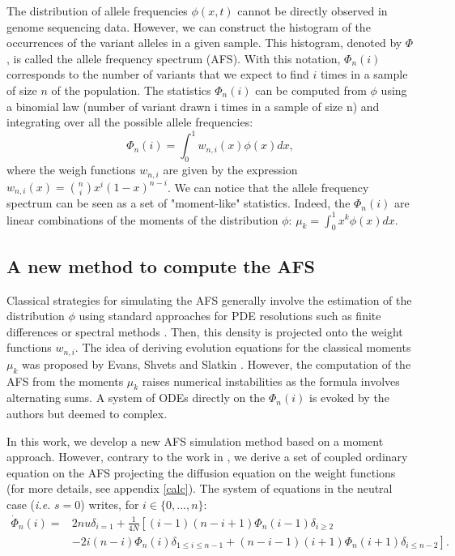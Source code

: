 The distribution of allele frequencies $\phi(x,t)$ cannot be directly observed in genome sequencing data. However, we can construct the histogram of the occurrences of the variant alleles in a given sample. This histogram, denoted by $\Phi$, is called the allele frequency spectrum (AFS). With this notation, $\Phi_n(i)$ corresponds to the number of variants that we expect to find $i$ times in a sample of size $n$ of the population. The statistics $\Phi_n(i)$ can be computed from $\phi$ using a binomial law (number of variant drawn i times in a sample of size n) and integrating over all the possible allele frequencies: 
$$
	 \Phi_n(i) = \int_0^1 w_{n,i}(x) \phi(x) dx,
$$
where the weigh functions $w_{n,i}$ are given by the expression $w_{n,i}(x) = {n\choose i}  x^i (1-x)^{n-i}$.
We can notice that the allele frequency spectrum can be seen as a set of "moment-like" statistics. Indeed, the $\Phi_n(i)$ are linear combinations of the moments of the distribution $\phi$: $\mu_k = \int_0^1 x^k \phi(x)dx$.

\subsection{A new method to compute the AFS}
Classical strategies for simulating the AFS generally involve the estimation of the distribution $\phi$ using standard approaches for PDE resolutions such as finite differences \cite{gutenkunst2009} or spectral methods \cite{lukic2011}. Then, this density is projected onto the weight functions $w_{n,i}$.
The idea of deriving evolution equations for the classical moments $\mu_k$ was proposed by Evans, Shvets and Slatkin \cite{evans2007}. However, the computation of the AFS from the moments $\mu_k$ raises numerical instabilities as the formula involves alternating sums. A system of ODEs directly on the $\Phi_n(i)$ is evoked by the authors but deemed to complex.

In this work, we develop a new AFS simulation method based on a moment approach. However, contrary to the work in \cite{evans2007}, we derive a set of coupled ordinary equation on the AFS projecting the diffusion equation on the weight functions (for more details, see appendix \ref{calc}). The system of equations in the neutral case (\textit{i.e.} $s = 0$) writes, for $i \in \{0,... , n\}$:
\begin{equation}
\begin{split}
\dot \Phi_n(i)=& 2nu  \delta_{i=1} + \frac{1}{4 N} \left[ (i-1)(n-i+1) \Phi_n(i-1)\delta_{i\geq 2} \right.\\
		      & \left.-2i(n-i)\Phi_n(i)\delta_{1\leq i\leq n-1}  + (n-i-1)(i+1)\Phi_n(i+1)\delta_{i\leq n-2} \right].
\end{split}
\label{eq:neutral}
\end{equation}

